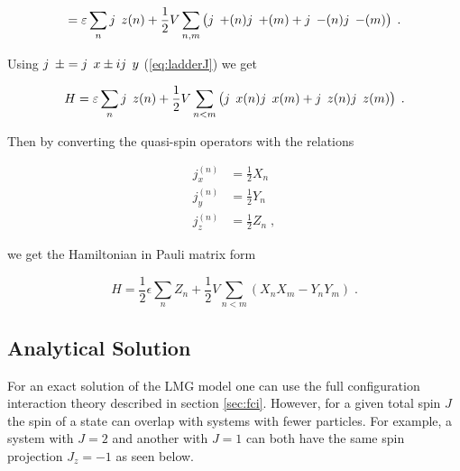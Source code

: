 \begin{equation}
= \varepsilon\sum_{n}\op{j}{z}{(n)} + \frac{1}{2}V \sum_{n,m}\left (\op{j}{+}{(n)}\op{j}{+}{(m)}+ \op{j}{-}{(n)}\op{j}{-}{(m)}\right ) \; .
\end{equation}

Using $\op{j}{\pm} = \op{j}{x} \pm i\op{j}{y}$ (\ref{eq:ladderJ}) we get

\begin{equation}
H = \varepsilon\sum_{n}\op{j}{z}{(n)} + \frac{1}{2}V \sum_{n < m}\left (\op{j}{x}{(n)}\op{j}{x}{(m)}+ \op{j}{z}{(n)}\op{j}{z}{(m)}\right ) \; .
\end{equation}

Then by converting the quasi-spin operators with the relations

\begin{align}
    j_x^{(n)} &= \frac{1}{2} X_n \\
    j_y^{(n)} &= \frac{1}{2} Y_n\\
    j_z^{(n)} &= \frac{1}{2} Z_n \; ,
\end{align}

we get the Hamiltonian in Pauli matrix form

\begin{equation}
    H=\frac{1}{2}\epsilon\sum_{n}Z_n+\frac{1}{2}V\sum_{n < m}(X_nX_m-Y_nY_m) \; .
\end{equation}

\subsection{Analytical Solution}

For an exact solution of the LMG model one can use the full configuration interaction theory described in section \ref{sec:fci}. However, for a given total spin $J$ the spin of a state can overlap with systems with fewer particles. For example, a system with $J=2$ and another with $J = 1$ can both have the same spin projection $J_z=-1$ as seen below.

